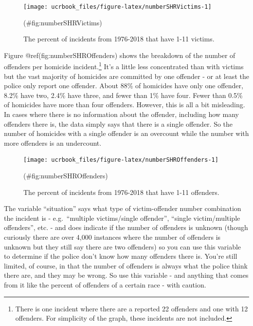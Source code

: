 \documentclass[
  12pt,
  openany]{book}
\begin{document}
\begin{figure}

{\centering \texttt{[image: ucrbook\_files/figure-latex/numberSHRVictims-1]} 

}

\caption{The percent of incidents from 1976-2018 that have 1-11 victims.}(\#fig:numberSHRVictims)
\end{figure}

Figure @ref(fig:numberSHROffenders) shows the breakdown of the number of offenders per homicide incident.\footnote{There is one incident where there are a reported 22 offenders and one with 12 offenders. For simplicity of the graph, these incidents are not included.} It's a little less concentrated than with victims but the vast majority of homicides are committed by one offender - or at least the police only report one offender. About 88\% of homicides have only one offender, 8.2\% have two, 2.4\% have three, and fewer than 1\% have four. Fewer than 0.5\% of homicides have more than four offenders. However, this is all a bit misleading. In cases where there is no information about the offender, including how many offenders there is, the data simply says that there is a single offender. So the number of homicides with a single offender is an overcount while the number with more offenders is an undercount.

\begin{figure}

{\centering \texttt{[image: ucrbook\_files/figure-latex/numberSHROffenders-1]} 

}

\caption{The percent of incidents from 1976-2018 that have 1-11 offenders.}(\#fig:numberSHROffenders)
\end{figure}

The variable ``situation'' says what type of victim-offender number combination the incident is - e.g.~``multiple victims/single offender'', ``single victim/multiple offenders'', etc. - and does indicate if the number of offenders is unknown (though curiously there are over 4,000 instances where the number of offenders is unknown but they still say there are two offenders) so you can use this variable to determine if the police don't know how many offenders there is. You're still limited, of course, in that the number of offenders is always what the police think there are, and they may be wrong. So use this variable - and anything that comes from it like the percent of offenders of a certain race - with caution.
\end{document}
